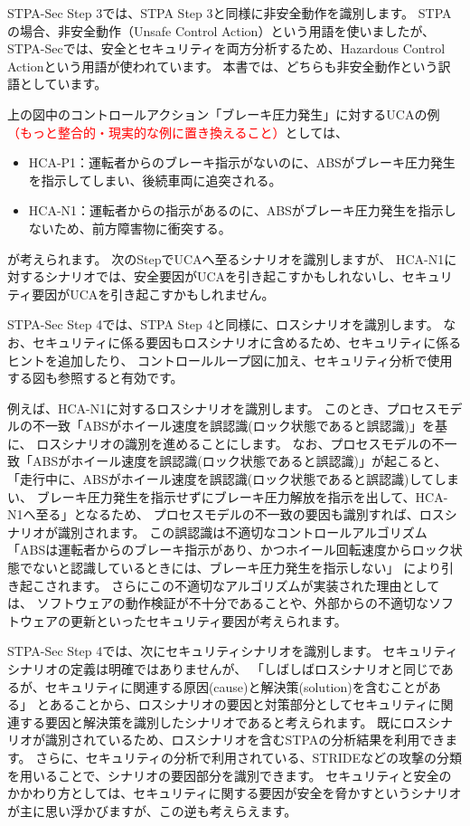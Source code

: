 STPA-Sec Step 3では、STPA Step 3と同様に非安全動作を識別します。
STPAの場合、非安全動作（Unsafe Control Action）という用語を使いましたが、
STPA-Secでは、安全とセキュリティを両方分析するため、Hazardous Control Actionという用語が使われています。
本書では、どちらも非安全動作という訳語としています。

上の図中のコントロールアクション「ブレーキ圧力発生」に対するUCAの例\textcolor{red}{（もっと整合的・現実的な例に置き換えること）}としては、
%
\begin{itemize}
    \item HCA-P1：運転者からのブレーキ指示がないのに、ABSがブレーキ圧力発生を指示してしまい、後続車両に追突される。
    \item HCA-N1：運転者からの指示があるのに、ABSがブレーキ圧力発生を指示しないため、前方障害物に衝突する。
\end{itemize}
%
が考えられます。
次のStepでUCAへ至るシナリオを識別しますが、
HCA-N1に対するシナリオでは、安全要因がUCAを引き起こすかもしれないし、セキュリティ要因がUCAを引き起こすかもしれません。

STPA-Sec Step 4では、STPA Step 4と同様に、ロスシナリオを識別します。
なお、セキュリティに係る要因もロスシナリオに含めるため、セキュリティに係るヒントを追加したり、
コントロールループ図に加え、セキュリティ分析で使用する図も参照すると有効です。

例えば、HCA-N1に対するロスシナリオを識別します。
このとき、プロセスモデルの不一致「ABSがホイール速度を誤認識(ロック状態であると誤認識)」を基に、
ロスシナリオの識別を進めることにします。
なお、プロセスモデルの不一致「ABSがホイール速度を誤認識(ロック状態であると誤認識)」が起こると、
「走行中に、ABSがホイール速度を誤認識(ロック状態であると誤認識)してしまい、
ブレーキ圧力発生を指示せずにブレーキ圧力解放を指示を出して、HCA-N1へ至る」となるため、
プロセスモデルの不一致の要因も識別すれば、ロスシナリオが識別されます。
この誤認識は不適切なコントロールアルゴリズム
「ABSは運転者からのブレーキ指示があり、かつホイール回転速度からロック状態でないと認識しているときには、ブレーキ圧力発生を指示しない」
により引き起こされます。
さらにこの不適切なアルゴリズムが実装された理由としては、
ソフトウェアの動作検証が不十分であることや、外部からの不適切なソフトウェアの更新といったセキュリティ要因が考えられます。

STPA-Sec Step 4では、次にセキュリティシナリオを識別します。
セキュリティシナリオの定義は明確ではありませんが、
「しばしばロスシナリオと同じであるが、セキュリティに関連する原因(cause)と解決策(solution)を含むことがある」
とあることから、ロスシナリオの要因と対策部分としてセキュリティに関連する要因と解決策を識別したシナリオであると考えられます。
既にロスシナリオが識別されているため、ロスシナリオを含むSTPAの分析結果を利用できます。
さらに、セキュリティの分析で利用されている、STRIDEなどの攻撃の分類を用いることで、シナリオの要因部分を識別できます。
セキュリティと安全のかかわり方としては、セキュリティに関する要因が安全を脅かすというシナリオが主に思い浮かびますが、この逆も考えらえます。

